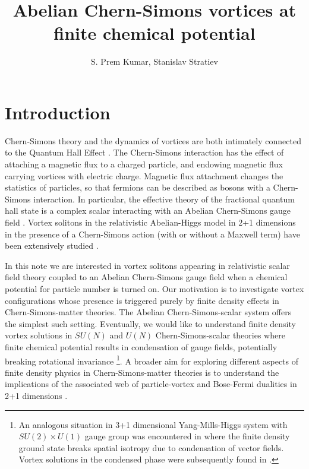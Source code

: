 \documentclass[12pt,a4paper]{article}
\title{Abelian Chern-Simons vortices at finite chemical potential}
\author{S. Prem Kumar, Stanislav Stratiev }
\affiliation{Department of Physics,\\
Swansea University,\\
Singleton Park, Swansea,\\
SA2 8PP, U.K.}
\begin{document}
\maketitle
\flushbottom
\section{Introduction}
Chern-Simons theory and the dynamics of vortices are both intimately connected to the Quantum Hall Effect \cite{Zhang:1988wy}. The Chern-Simons interaction  has the effect of attaching a magnetic flux to a charged particle, and endowing magnetic flux carrying vortices  with electric charge.  Magnetic flux attachment changes the  statistics of particles, so that fermions can be described as bosons with a Chern-Simons interaction. In particular, the effective theory of the fractional quantum hall state is a complex scalar interacting with an Abelian Chern-Simons gauge field \cite{Zhang:1988wy, Tong:2016kpv}.
Vortex solitons in the relativistic Abelian-Higgs model  in 2+1 dimensions in the presence  of a Chern-Simons action  (with or without a Maxwell term) have been extensively studied \cite{Paul:1986ix, Jackiw:1990aw, Hong:1990yh, Jackiw:1990pr, Dunne:1998qy, Horvathy:2008hd}.

In this note we are interested in vortex solitons appearing in  relativistic scalar field theory coupled to an Abelian Chern-Simons gauge field when a chemical potential for particle number is turned on. Our motivation is to investigate vortex configurations whose presence is triggered purely by finite density effects in Chern-Simons-matter theories. The Abelian Chern-Simons-scalar system offers the simplest  such setting. Eventually, we would like to understand finite density vortex solutions in $SU(N)$ and $U(N)$ Chern-Simons-scalar theories where  finite chemical potential results in condensation of gauge fields, potentially breaking rotational invariance \cite{Kumar:2018nkf}\footnote{An analogous situation in 3+1 dimensional Yang-Mills-Higgs system with $SU(2)\times U(1)$ gauge group was encountered in \cite{Gusynin:2003yu} where the finite density ground state breaks spatial isotropy due to condensation of vector fields.  Vortex solutions in the condensed phase were subsequently found in \cite{Gorbar:2005pi}.}.
A broader aim for exploring different aspects of finite density physics in Chern-Simons-matter theories is to understand the implications of the associated web \cite{Seiberg:2016gmd, Karch:2016sxi, Murugan:2016zal} of particle-vortex and Bose-Fermi dualities in 2+1 dimensions  
\cite{Giombi:2011kc, Aharony:2011jz, Aharony:2012nh, Aharony:2012ns, Jain:2013py, Jain:2013gza, Takimi:2013zca, Aharony:2015mjs, Geracie:2015drf}.
\end{document}
